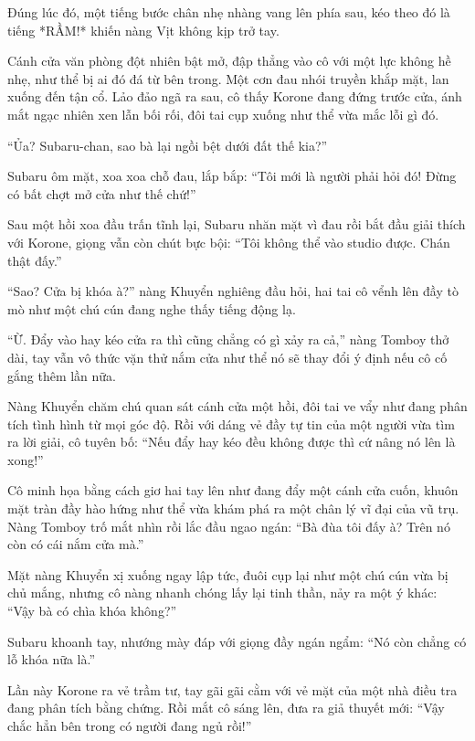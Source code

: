 \documentclass[../main.tex]{subfiles}
\begin{document}
Đúng lúc đó, một tiếng bước chân nhẹ nhàng vang lên phía sau, kéo theo đó là tiếng *RẦM!* khiến nàng Vịt không kịp trở tay.

Cánh cửa văn phòng đột nhiên bật mở, đập thẳng vào cô với một lực không hề nhẹ, như thể bị ai đó đá từ bên trong. Một cơn đau nhói truyền khắp mặt, lan xuống đến tận cổ. Lảo đảo ngã ra sau, cô thấy Korone đang đứng trước cửa, ánh mắt ngạc nhiên xen lẫn bối rối, đôi tai cụp xuống như thể vừa mắc lỗi gì đó.


``Ủa? Subaru-chan, sao bà lại ngồi bệt dưới đất thế kia?''

Subaru ôm mặt, xoa xoa chỗ đau, lắp bắp: ``Tôi mới là người phải hỏi đó! Đừng có bất chợt mở cửa như thế chứ!''

\ct

Sau một hồi xoa đầu trấn tĩnh lại, Subaru nhăn mặt vì đau rồi bắt đầu giải thích với Korone, giọng vẫn còn chút bực bội: ``Tôi không thể vào studio được. Chán thật đấy.''

``Sao? Cửa bị khóa à?'' nàng Khuyển nghiêng đầu hỏi, hai tai cô vểnh lên đầy tò mò như một chú cún đang nghe thấy tiếng động lạ.

``Ừ. Đẩy vào hay kéo cửa ra thì cũng chẳng có gì xảy ra cả,'' nàng Tomboy thở dài, tay vẫn vô thức vặn thử nắm cửa như thể nó sẽ thay đổi ý định nếu cô cố gắng thêm lần nữa.

Nàng Khuyển chăm chú quan sát cánh cửa một hồi, đôi tai ve vẩy như đang phân tích tình hình từ mọi góc độ. Rồi với dáng vẻ đầy tự tin của một người vừa tìm ra lời giải, cô tuyên bố: ``Nếu đẩy hay kéo đều không được thì cứ nâng nó lên là xong!''

Cô minh họa bằng cách giơ hai tay lên như đang đẩy một cánh cửa cuốn, khuôn mặt tràn đầy hào hứng như thể vừa khám phá ra một chân lý vĩ đại của vũ trụ.
Nàng Tomboy trố mắt nhìn rồi lắc đầu ngao ngán: ``Bà đùa tôi đấy à? Trên nó còn có cái nắm cửa mà.''

Mặt nàng Khuyển xị xuống ngay lập tức, đuôi cụp lại như một chú cún vừa bị chủ mắng, nhưng cô nàng nhanh chóng lấy lại tinh thần, nảy ra một ý khác: ``Vậy bà có chìa khóa không?''

Subaru khoanh tay, nhướng mày đáp với giọng đầy ngán ngẩm: ``Nó còn chẳng có lỗ khóa nữa là.''

Lần này Korone ra vẻ trầm tư, tay gãi gãi cằm với vẻ mặt của một nhà điều tra đang phân tích bằng chứng. Rồi mắt cô sáng lên, đưa ra giả thuyết mới: ``Vậy chắc hẳn bên trong có người đang ngủ rồi!''
\end{document}
